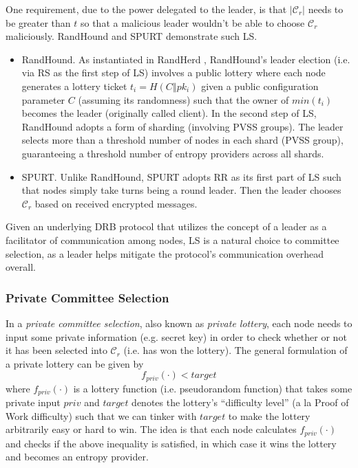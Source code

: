 \documentclass[letterpaper,twocolumn,10pt]{article}
\theoremstyle{definition}
\theoremstyle{remark}
\begin{document}
One requirement, due to the power delegated to the leader, is that $|\mathcal{C}_r|$ needs to be greater than $t$ so that a malicious leader wouldn't be able to choose $\mathcal{C}_r$ maliciously. RandHound \cite{syta2017scalable} and SPURT \cite{das2021spurt} demonstrate such LS.
\begin{itemize}
\item RandHound. As instantiated in RandHerd \cite{syta2017scalable}, RandHound's leader election (i.e. via RS as the first step of LS) involves a public lottery where each node generates a lottery ticket $t_i = H(C \mathbin\Vert pk_i)$ given a public configuration parameter $C$ (assuming its randomness) such that the owner of $min(t_i)$ becomes the leader (originally called client). In the second step of LS, RandHound adopts a form of sharding (involving PVSS groups). The leader selects more than a threshold number of nodes in each shard (PVSS group), guaranteeing a threshold number of entropy providers across all shards.
\item SPURT. Unlike RandHound, SPURT adopts RR as its first part of LS such that nodes simply take turns being a round leader. Then the leader chooses $\mathcal{C}_r$ based on received encrypted messages.
\end{itemize}

Given an underlying DRB protocol that utilizes the concept of a leader as a facilitator of communication among nodes, LS is a natural choice to committee selection, as a leader helps mitigate the protocol's communication overhead overall.

\subsubsection{Private Committee Selection}
\label{subsubsection:private-committee-selection}
In a \textit{private committee selection}, also known as \textit{private lottery}, each node needs to input some private information (e.g. secret key) in order to check whether or not it has been selected into $\mathcal{C}_r$ (i.e. has won the lottery). The general formulation of a private lottery can be given by
\[
f_{priv}(\cdot) < target
\]
where $f_{priv}(\cdot)$ is a lottery function (i.e. pseudorandom function) that takes some private input $priv$ and $target$ denotes the lottery's ``difficulty level'' (a la Proof of Work difficulty) such that we can tinker with $target$ to make the lottery arbitrarily easy or hard to win. The idea is that each node calculates $f_{priv}(\cdot)$ and checks if the above inequality is satisfied, in which case it wins the lottery and becomes an entropy provider.
\end{document}
